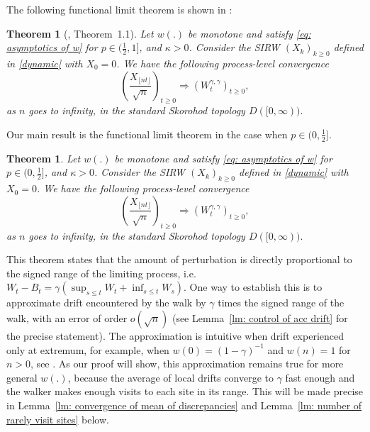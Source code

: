 \documentclass[twoside,12pt, a4paper, final]{article}
\newtheorem{theorem}{Theorem}[section]
\newtheorem*{theorem*}{Theorem}
\numberwithin{equation}{section}
\theoremstyle{remark}
\begin{document}
	\begin{samepage}
		The following functional limit theorem is shown in \cite{KMP23}: 
		\begin{theorem*}[\cite{KMP23}, Theorem~1.1]
			Let $w(.)$ be monotone and satisfy \eqref{eq: asymptotics of w} for $p\in (\frac{1}{2},1]$, and $\kappa >0 $. Consider the SIRW $(X_k)_{k\geq 0}$ defined in \eqref{dynamic} with $X_0 =0$. We have the following process-level convergence
			\[
			\left(  \frac{X_{\lfloor nt \rfloor }}{\sqrt{n}}  \right)_{t\geq 0} \Longrightarrow \left( W^{\gamma,\gamma}_{t}\right)_{t\geq 0},
			\] 
			as $n$ goes to infinity, in the standard Skorohod topology $D([0,\infty) ).$
		\end{theorem*}
	\end{samepage}
	\begin{samepage}
		Our main result is the functional limit theorem in the case when $p\in (0,\frac{1}{2}]$.
		\begin{theorem}\label{thm: main}
			Let $w(.)$ be monotone and satisfy \eqref{eq: asymptotics of w} for $p\in (0,\frac{1}{2}]$, and $\kappa >0 $. Consider the SIRW $(X_k)_{k\geq 0}$ defined in \eqref{dynamic} with $X_0 =0$. We have the following process-level convergence
			\[
			\left(  \frac{X_{\lfloor nt \rfloor }}{\sqrt{n}}  \right)_{t\geq 0} \Longrightarrow \left( W^{\gamma,\gamma}_{t}\right)_{t\geq 0},
			\]
			as $n$ goes to infinity, in the standard Skorohod topology $D([0,\infty) ).$
		\end{theorem}
	\end{samepage}
	
	This theorem states that the amount of perturbation is directly proportional to the signed range of the limiting process, i.e. $W_t - B_t = \gamma \left( \sup_{s \le t} W_t + \inf _{s \le t} W_s \right) $. 
	One way to establish this is to approximate drift encountered by the walk by $\gamma$ times the signed range of the walk, with an error of order $o\left(\sqrt{n} \right)$ (see Lemma~\ref{lm: control of acc drift} for the precise statement). 
	The approximation is intuitive when drift experienced only at extremum, for example, when $w(0) = (1 - \gamma)^{-1}$ and $w(n) = 1$ for $n > 0$, see \cite{Dav99}. 
	As our proof will show, this approximation remains true for more general $w(.)$, because the average of local drifts converge to $\gamma$ fast enough and the walker makes enough visits to each site in its range. 
	This will be made precise in Lemma~\ref{lm: convergence of mean of discrepancies} and Lemma~\ref{lm: number of rarely visit sites} below. 
	
\end{document}

